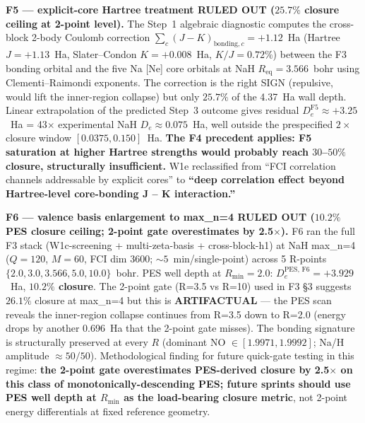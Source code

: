 \documentclass[aps,pra,twocolumn,superscriptaddress,longbibliography]{revtex4-2}
\begin{document}
\textbf{F5 --- explicit-core Hartree treatment RULED OUT
($25.7\%$ closure ceiling at 2-point level).} The Step~1 algebraic
diagnostic computes the cross-block 2-body Coulomb correction
$\sum_c (J - K)_{\text{bonding},c} = +1.12$~Ha (Hartree $J = +1.13$~Ha,
Slater--Condon $K = +0.008$~Ha, $K/J = 0.72\%$) between the F3
bonding orbital and the five Na [Ne] core orbitals at NaH
$R_\text{eq} = 3.566$~bohr using Clementi--Raimondi exponents. The
correction is the right SIGN (repulsive, would lift the inner-region
collapse) but only $25.7\%$ of the 4.37~Ha wall depth. Linear
extrapolation of the predicted Step~3 outcome gives residual
$D_e^\text{F5} \approx +3.25$~Ha = 43$\times$ experimental NaH
$D_e \approx 0.075$~Ha, well outside the prespecified
$2\times$ closure window $[0.0375, 0.150]$~Ha. \textbf{The F4
precedent applies: F5 saturation at higher Hartree strengths would
probably reach $30$--$50\%$ closure, structurally insufficient.}
W1e reclassified from ``FCI correlation channels addressable by
explicit cores'' to \textbf{``deep correlation effect beyond
Hartree-level core-bonding J -- K interaction.''}

\textbf{F6 --- valence basis enlargement to max\_n=4 RULED OUT
($10.2\%$ PES closure ceiling; 2-point gate overestimates by 2.5$\times$).}
F6 ran the full F3 stack (W1c-screening + multi-zeta-basis +
cross-block-h1) at NaH max\_n=4 ($Q = 120$, $M = 60$, FCI dim 3600;
${\sim}5$~min/single-point) across 5 R-points $\{2.0, 3.0, 3.566,
5.0, 10.0\}$~bohr. PES well depth at $R_\text{min}=2.0$:
$D_e^\text{PES, F6} = +3.929$~Ha, \textbf{$10.2\%$ closure}. The
2-point gate (R=3.5 vs R=10) used in F3 §3 suggests $26.1\%$ closure
at max\_n=4 but this is \textbf{ARTIFACTUAL} --- the PES scan reveals
the inner-region collapse continues from R=3.5 down to R=2.0 (energy
drops by another 0.696~Ha that the 2-point gate misses). The bonding
signature is structurally preserved at every $R$ (dominant NO
$\in [1.9971, 1.9992]$; Na/H amplitude $\approx 50/50$). Methodological
finding for future quick-gate testing in this regime: \textbf{the
2-point gate overestimates PES-derived closure by 2.5$\times$ on
this class of monotonically-descending PES; future sprints should
use PES well depth at $R_\text{min}$ as the load-bearing closure
metric}, not 2-point energy differentials at fixed reference geometry.
\end{document}
